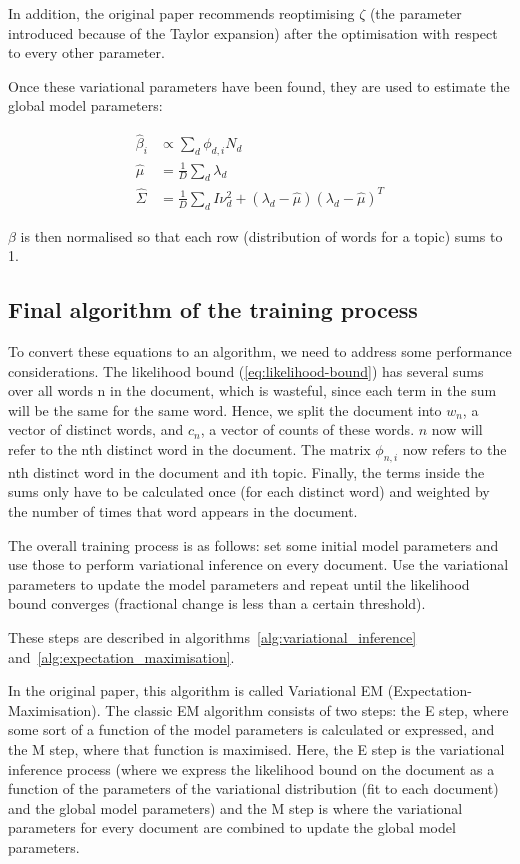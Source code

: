 \documentclass[12pt,a4paper,twoside,openright]{report}
\begin{document}
In addition, the original paper recommends reoptimising $\zeta$ (the parameter introduced because of the Taylor expansion) after the optimisation with respect to every other parameter.

Once these variational parameters have been found, they are used to estimate the global model parameters:

\begin{align}
\hat\beta_i & \propto \sum\limits_d\phi_{d, i}N_d \\ \label{eq:betaopt}
\hat\mu & = \frac{1}{D} \sum\limits_d\lambda_d \\ 
\hat\Sigma & = \frac{1}{D} \sum\limits_d I\nu^2_d + (\lambda_d - \hat\mu)(\lambda_d - \hat\mu)^T
\end{align}

$\beta$ is then normalised so that each row (distribution of words for a topic) sums to 1.

\subsection{Final algorithm of the training process}

To convert these equations to an algorithm, we need to address some performance considerations. The likelihood bound (\ref{eq:likelihood-bound}) has several sums over all words n in the document, which is wasteful, since each term in the sum will be the same for the same word. Hence, we split the document into $w_n$, a vector of distinct words, and $c_n$, a vector of counts of these words. $n$ now will refer to the nth distinct word in the document. The matrix $\phi_{n, i}$ now refers to the nth distinct word in the document and ith topic. Finally, the terms inside the sums only have to be calculated once (for each distinct word) and weighted by the number of times that word appears in the document.

The overall training process is as follows: set some initial model parameters and use those to perform variational inference on every document. Use the variational parameters to update the model parameters and repeat until the likelihood bound converges (fractional change is less than a certain threshold).

These steps are described in algorithms~\ref{alg:variational_inference} and~\ref{alg:expectation_maximisation}.

In the original paper, this algorithm is called Variational EM (Expectation-Maximisation). The classic EM algorithm consists of two steps: the E step, where some sort of a function of the model parameters is calculated or expressed, and the M step, where that function is maximised. Here, the E step is the variational inference process (where we express the likelihood bound on the document as a function of the parameters of the variational distribution (fit to each document) and the global model parameters) and the M step is where the variational parameters for every document are combined to update the global model parameters.
\end{document}
